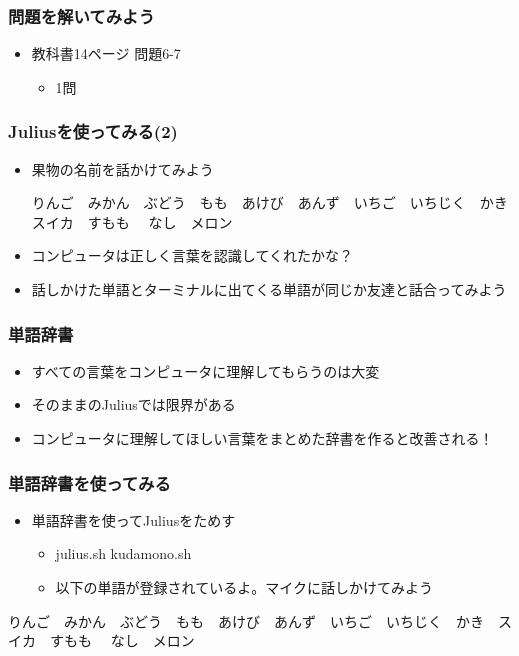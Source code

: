 \documentclass[14pt]{beamer}
\begin{document}
\begin{frame}
  \frametitle{問題を解いてみよう}
  \begin{itemize}
    \item 教科書14ページ 問題6-7
    \begin{itemize}
      \item 1問
    \end{itemize}
  \end{itemize}
\end{frame}

\begin{frame}
  \frametitle{Juliusを使ってみる(2)}
  \begin{itemize}
    \item 果物の名前を話かけてみよう
    \begin{center}
      {\small りんご　みかん　ぶどう　もも　あけび　あんず　いちご　いちじく　かき　スイカ　すもも　	なし　メロン}
    \end{center}
    \item コンピュータは正しく言葉を認識してくれたかな？
    \item 話しかけた単語とターミナルに出てくる単語が同じか友達と話合ってみよう
  \end{itemize}
\end{frame}

\begin{frame}
  \frametitle{単語辞書}
  \begin{itemize}
    \item すべての言葉をコンピュータに理解してもらうのは大変
    \item そのままのJuliusでは限界がある
    \item コンピュータに理解してほしい言葉をまとめた辞書を作ると改善される！
  \end{itemize}
\end{frame}

\begin{frame}
  \frametitle{単語辞書を使ってみる}
  \begin{itemize}
    \item 単語辞書を使ってJuliusをためす
    \begin{itemize}
      \item julius.sh kudamono.sh
      \item 以下の単語が登録されているよ。マイクに話しかけてみよう
    \end{itemize}
  \end{itemize}
  \begin{center}
    {\small りんご　みかん　ぶどう　もも　あけび　あんず　いちご　いちじく　かき　スイカ　すもも　	なし　メロン}
  \end{center}
\end{frame}
\end{document}

